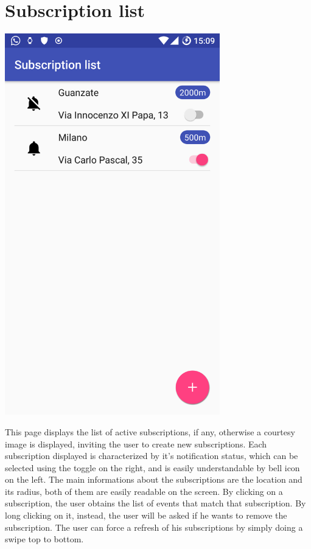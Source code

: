\documentclass[a4paper]{scrreprt}
\begin{document}
\section{Subscription list}
\begin{minipage}{0.5\textwidth}
	\centering
	\includegraphics[width=0.7\textwidth]{subscription_list}
\end{minipage}
\begin{minipage}{0.5\textwidth}
	This page displays the list of active subscriptions, if any, otherwise a courtesy image is displayed, inviting the user to create new subscriptions. Each subscription displayed is characterized by it's notification status, which can be selected using the toggle on the right, and is easily understandable by bell icon on the left. The main informations about the subscriptions are the location and its radius, both of them are easily readable on the screen. By clicking on a subscription, the user obtains the list of events that match that subscription. By long clicking on it, instead, the user will be asked if he wants to remove the subscription. The user can force a refresh of his subscriptions by simply doing a swipe top to bottom.
\end{minipage}
\end{document}
